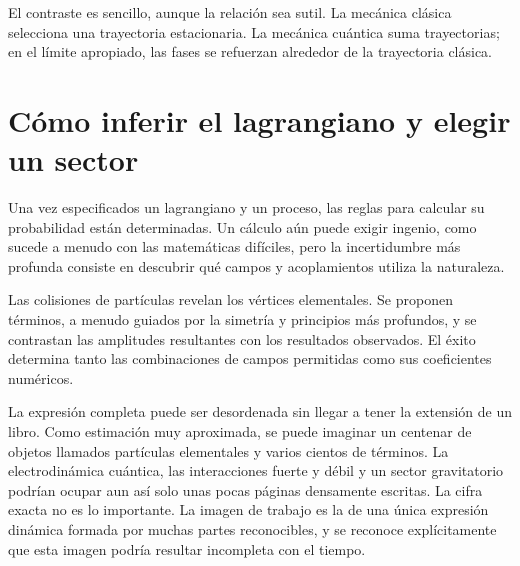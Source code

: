 El contraste es sencillo, aunque la relación sea sutil. La mecánica clásica selecciona una trayectoria estacionaria. La mecánica cuántica suma trayectorias; en el límite apropiado, las fases se refuerzan alrededor de la trayectoria clásica.

\section{Cómo inferir el lagrangiano y elegir un sector}

Una vez especificados un lagrangiano y un proceso, las reglas para calcular su probabilidad están determinadas. Un cálculo aún puede exigir ingenio, como sucede a menudo con las matemáticas difíciles, pero la incertidumbre más profunda consiste en descubrir qué campos y acoplamientos utiliza la naturaleza.

\begin{classroomqa}
\end{classroomqa}

Las colisiones de partículas revelan los vértices elementales. Se proponen términos, a menudo guiados por la simetría y principios más profundos, y se contrastan las amplitudes resultantes con los resultados observados. El éxito determina tanto las combinaciones de campos permitidas como sus coeficientes numéricos.

\begin{classroomqa}
\end{classroomqa}

La expresión completa puede ser desordenada sin llegar a tener la extensión de un libro. Como estimación muy aproximada, se puede imaginar un centenar de objetos llamados partículas elementales y varios cientos de términos. La electrodinámica cuántica, las interacciones fuerte y débil y un sector gravitatorio podrían ocupar aun así solo unas pocas páginas densamente escritas. La cifra exacta no es lo importante. La imagen de trabajo es la de una única expresión dinámica formada por muchas partes reconocibles, y se reconoce explícitamente que esta imagen podría resultar incompleta con el tiempo.

